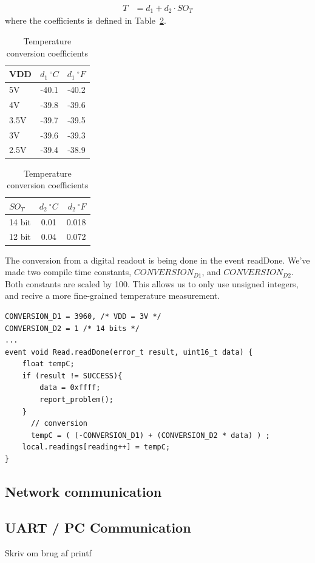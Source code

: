 \begin{align*}
	T &= d_{1} + d_{2} \cdot SO_{T}
\end{align*}
where the coefficients is defined in Table~\ref{table:temperature}.
\begin{table}[ht]
\centering
\begin{tabular}{ | l | c | r | }
	\hline
	VDD & $d_{1} \ ^{\circ}  C$ & $d_{1} \ ^{\circ}  F$ \\
	\hline \hline
	5V & -40.1 & -40.2 \\
	\hline
	4V & -39.8 & -39.6 \\
	\hline
	3.5V & -39.7 & -39.5 \\
	\hline
	3V & -39.6 & -39.3 \\
	\hline
	2.5V & -39.4 & -38.9 \\
	\hline
\end{tabular}
\begin{tabular}{ | l | c | r | }
	\hline
	$SO_{T}$ & $d_{2}  \ ^{\circ}C$ & $d_{2} \ ^{\circ} F$ \\
	\hline \hline
	14 bit & 0.01 & 0.018 \\
	\hline
	12 bit & 0.04 & 0.072\\
	\hline
\end{tabular}
\caption{Temperature conversion coefficients}
\label{table:temperature}
\end{table}
The conversion from a digital readout is being done in the event readDone.
We've made two compile time constants, $CONVERSION_{D1}$, and
$CONVERSION_{D2}$. Both constants are scaled by 100. This allows us to only use
unsigned integers, and recive a more fine-grained temperature measurement.

\begin{lstlisting}
CONVERSION_D1 = 3960, /* VDD = 3V */
CONVERSION_D2 = 1 /* 14 bits */
...
event void Read.readDone(error_t result, uint16_t data) {
	float tempC;
	if (result != SUCCESS){
		data = 0xffff;
		report_problem();
	}
	  // conversion
	  tempC = ( (-CONVERSION_D1) + (CONVERSION_D2 * data) ) ;
    local.readings[reading++] = tempC;
}
\end{lstlisting}


\subsection{Network communication}

\subsection{UART / PC Communication}
Skriv om brug af printf

